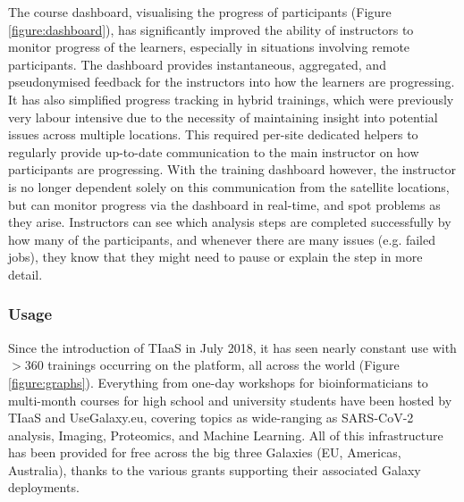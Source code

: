 \documentclass[a4paper,num-refs]{oup-contemporary}
\begin{document}
The course dashboard, visualising the progress of participants (Figure \ref{figure:dashboard}), has significantly improved the ability of instructors to monitor progress of the learners, especially in situations involving remote participants. The dashboard provides instantaneous, aggregated, and pseudonymised feedback for the instructors into how the learners are progressing. It has also simplified progress tracking in hybrid trainings, which were previously very labour intensive due to the necessity of maintaining insight into potential issues across multiple locations. This required per-site dedicated helpers to regularly provide up-to-date communication to the main instructor on how participants are progressing. With the training dashboard however, the instructor is no longer dependent solely on this communication from the satellite locations, but can monitor progress via the dashboard in real-time, and spot problems as they arise. Instructors can see which analysis steps are completed successfully by how many of the participants, and whenever there are many issues (e.g. failed jobs), they know that they might need to pause or explain the step in more detail.

\subsubsection{Usage}
Since the introduction of TIaaS in July 2018, it has seen nearly constant use with $>$360 trainings occurring on the platform, all across the world (Figure \ref{figure:graphs}).
Everything from one-day workshops for bioinformaticians to multi-month courses for high school and university students have been hosted by TIaaS and UseGalaxy.eu, covering topics as wide-ranging as SARS-CoV-2 analysis, Imaging, Proteomics, and Machine Learning. All of this infrastructure has been provided for free across the big three Galaxies (EU, Americas, Australia), thanks to the various grants supporting their associated Galaxy deployments.
\end{document}
